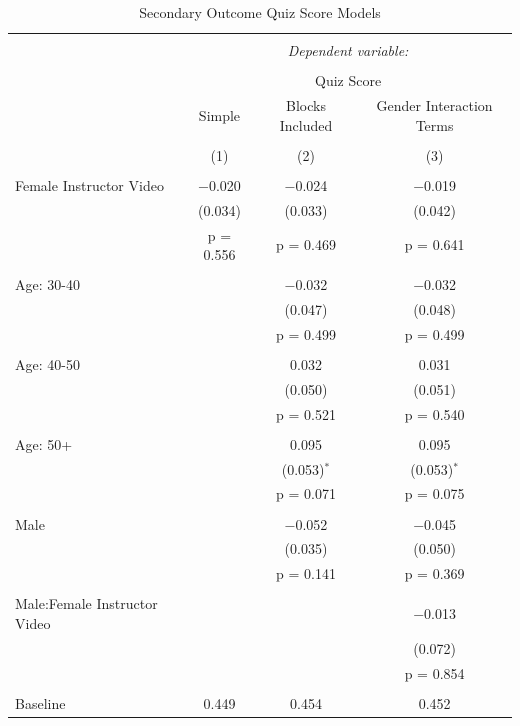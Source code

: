 \documentclass[
]{article}
\begin{document}
\begin{table}[!htbp] \centering 
  \caption{Secondary Outcome Quiz Score Models} 
  \label{} 
\small 
\begin{tabular}{@{\extracolsep{3pt}}lccc} 
\\[-1.8ex]\hline 
\hline \\[-1.8ex] 
 & \multicolumn{3}{c}{\textit{Dependent variable:}} \\ 
\cline{2-4} 
\\[-1.8ex] & \multicolumn{3}{c}{Quiz Score} \\ 
 & Simple & Blocks Included & Gender Interaction Terms \\ 
\\[-1.8ex] & (1) & (2) & (3)\\ 
\hline \\[-1.8ex] 
 Female Instructor Video & $-$0.020 & $-$0.024 & $-$0.019 \\ 
  & (0.034) & (0.033) & (0.042) \\ 
  & p = 0.556 & p = 0.469 & p = 0.641 \\ 
  & & & \\ 
 Age: 30-40 &  & $-$0.032 & $-$0.032 \\ 
  &  & (0.047) & (0.048) \\ 
  &  & p = 0.499 & p = 0.499 \\ 
  & & & \\ 
 Age: 40-50 &  & 0.032 & 0.031 \\ 
  &  & (0.050) & (0.051) \\ 
  &  & p = 0.521 & p = 0.540 \\ 
  & & & \\ 
 Age: 50+ &  & 0.095 & 0.095 \\ 
  &  & (0.053)$^{*}$ & (0.053)$^{*}$ \\ 
  &  & p = 0.071 & p = 0.075 \\ 
  & & & \\ 
 Male &  & $-$0.052 & $-$0.045 \\ 
  &  & (0.035) & (0.050) \\ 
  &  & p = 0.141 & p = 0.369 \\ 
  & & & \\ 
 Male:Female Instructor Video &  &  & $-$0.013 \\ 
  &  &  & (0.072) \\ 
  &  &  & p = 0.854 \\ 
  & & & \\ 
 Baseline & 0.449 & 0.454 & 0.452 \\ 

\end{tabular}
\end{table}
\end{document}
